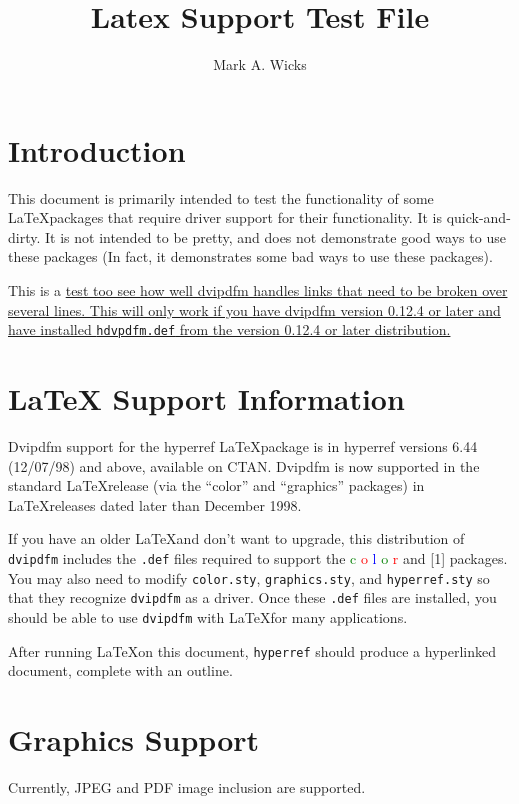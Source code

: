 \documentclass[dvipdfm]{article}
\title{\color{blue}Latex Support Test File}
\author{\color{green}Mark A. Wicks}
\begin{document}
\maketitle
\section{Introduction}
This document is primarily intended
to test the functionality
of some \LaTeX\space packages that require
driver support for their functionality.
It is quick-and-dirty.
It is not intended to be pretty, and
does not demonstrate good ways to use these packages
(In fact, it demonstrates some bad ways to use these packages).

This is a \href{http://odo.kettering.edu/dvipdfm/}{test too see how
well dvipdfm handles links that need to be broken over several lines.  This
will only work if you have dvipdfm version 0.12.4 or later
and have installed {\tt hdvpdfm.def} from the version 0.12.4 or
later distribution.}

\section{LaTeX Support Information}
Dvipdfm support for the hyperref \LaTeX\space package is 
in hyperref versions 6.44 (12/07/98) and above, available on CTAN.
Dvipdfm is now supported in the
standard \LaTeX\space release (via the ``color'' and ``graphics'' packages) in
\LaTeX\space releases dated later than December 1998.

If you have an older LaTeX\space and don't want to upgrade,
this distribution of {\tt dvipdfm} includes
the {\tt .def} files required to support
the
{\textcolor{green}{c}%
\textcolor{red}{o}%
\textcolor{blue}{l}%
\textcolor{green}{o}%
\textcolor{red}{r}
and
\scalebox{1.3}[1]{}
packages.}
You may also need to modify {\tt color.sty}, {\tt graphics.sty},
and {\tt hyperref.sty} so that they
recognize {\tt dvipdfm} as a driver.
Once these {\tt .def} files are installed,
you should be able to use {\tt dvipdfm}
with \LaTeX\space for many applications.

After running \LaTeX\space on this
document, {\tt hyperref}
should produce a hyperlinked
document, complete with an outline.

\newpage
\section{Graphics Support}
Currently, JPEG and PDF image
inclusion are supported.
\end{document}
